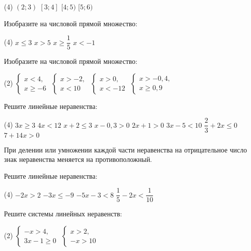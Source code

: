 \begin{class}[number=5]
\begin{listofex}
		\begin{tasks}(4)
			\task \( (2;3) \)
			\task \( [3;4] \)
			\task \( [4;5) \)
			\task \( [5;6) \)
		\end{tasks}
		\item Изобразите на числовой прямой множество:
		\begin{tasks}(4)
			\task \( x\leq3 \)
			\task \( x>5 \)
			\task \( x\geq\dfrac{1}{5} \)
			\task \( x<-1 \)
		\end{tasks}
			\item Изобразите на числовой прямой множество:
		\begin{tasks}(2)
			\task \( \left\{
			\begin{array}{l}
				x<4,\\
				x\geq-6
			\end{array}
			\right. \)
			\task \( \left\{
			\begin{array}{l}
				x>-2,\\
				x<10
			\end{array}
			\right. \)
			\task \( \left\{
			\begin{array}{l}
				x>0,\\
				x<-12
			\end{array}
			\right. \)
			\task \( \left\{
			\begin{array}{l}
				x>-0,4,\\
				x\geq0,9
			\end{array}
			\right. \)
		\end{tasks}
		\item Решите линейные неравенства:
		\begin{tasks}(4)
			\task \( 3x\geq3 \)
			\task \( 4x<12 \)
			\task \( x+2\leq3 \)
			\task \( x-0,3>0 \)
			\task \( 2x+1>0 \)
			\task \( 3x-5<10\)
			\task \( \dfrac{2}{3}+2x\leq0 \)
			\task \( 7+14x>0 \)
		\end{tasks}
	\end{listofex}
		\begin{definit}
		При делении или умножении каждой части неравенства на отрицательное число знак неравенства меняется на противоположный. 
		\end{definit}
		\begin{listofex}[resume]
		\item Решите линейные неравенства:
		\begin{tasks}(4)
			\task \( -2x>2 \)
			\task \( -3x\leq-9 \)
			\task \( -5x-3<8 \)
			\task \( \dfrac{1}{5}-2x<\dfrac{1}{10} \)
		\end{tasks}
		\item Решите системы линейных неравенств:
		\begin{tasks}(2)
			\task \( \left\{
			\begin{array}{l}
				-x>4,\\
				3x-1\geq0
			\end{array}
			\right. \)
			\task \( \left\{
			\begin{array}{l}
				x>2,\\
				-x>10
			\end{array}
			\right. \)
		\end{tasks}
	\end{listofex}
\end{class}
